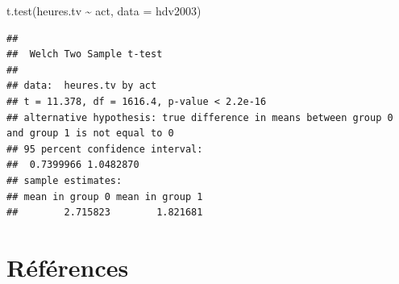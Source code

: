 \documentclass[
]{book}
\newenvironment{Shaded}{\begin{snugshade}}{\end{snugshade}}
\newcommand{\AttributeTok}[1]{\textcolor[rgb]{0.77,0.63,0.00}{#1}}
\newcommand{\FunctionTok}[1]{\textcolor[rgb]{0.00,0.00,0.00}{#1}}
\newcommand{\NormalTok}[1]{#1}
\newcommand{\SpecialCharTok}[1]{\textcolor[rgb]{0.00,0.00,0.00}{#1}}
\begin{document}
\begin{Shaded}
\begin{Highlighting}[]
\FunctionTok{t.test}\NormalTok{(heures.tv }\SpecialCharTok{\textasciitilde{}}\NormalTok{ act, }\AttributeTok{data =}\NormalTok{ hdv2003)}
\end{Highlighting}
\end{Shaded}

\begin{verbatim}
## 
##  Welch Two Sample t-test
## 
## data:  heures.tv by act
## t = 11.378, df = 1616.4, p-value < 2.2e-16
## alternative hypothesis: true difference in means between group 0 and group 1 is not equal to 0
## 95 percent confidence interval:
##  0.7399966 1.0482870
## sample estimates:
## mean in group 0 mean in group 1 
##        2.715823        1.821681
\end{verbatim}

\hypertarget{ruxe9fuxe9rences}{%
\chapter*{Références}\label{ruxe9fuxe9rences}}

  
\end{document}
